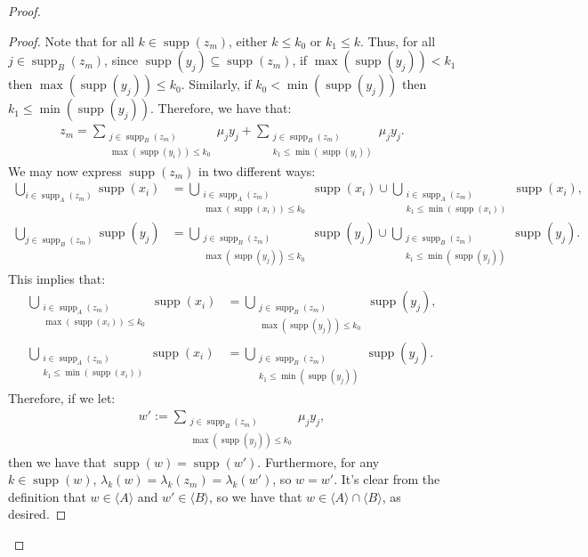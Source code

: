 \documentclass[10pt,a4paper]{amsart}
\theoremstyle{plain}
\numberwithin{equation}{section}
\theoremstyle{definition}
\newcommand{\func}{\operatorname}
\renewcommand{\c}[1]{\langle #1 \rangle}
\newcommand{\supp}{\func{supp}}
\newenvironment{midproof}[1][Proof]
  {\begin{proof}[#1]\renewcommand{\qedsymbol}{$\blacksquare$}}
  {\end{proof}}
\begin{document}
\begin{proof}
\begin{midproof}
        Note that for all $k \in \supp(z_m)$, either $k \leq k_0$ or $k_1 \leq k$. Thus, for all $j \in \supp_B(z_m)$, since $\supp(y_j) \subseteq \supp(z_m)$, if $\max(\supp(y_j)) < k_1$ then $\max(\supp(y_j)) \leq k_0$. Similarly, if $k_0 < \min(\supp(y_j))$ then $k_1 \leq \min(\supp(y_j))$. Therefore, we have that:
        \begin{align*}
            z_m = \sum_{\substack{j \in \supp_B(z_m) \\ \max(\supp(y_i)) \leq k_0}} \mu_j y_j + \sum_{\substack{j \in \supp_B(z_m) \\ k_1 \leq \min(\supp(y_i))}} \mu_j y_j.
        \end{align*}
        We may now express $\supp(z_m)$ in two different ways:
        \begin{align*}
            \bigcup_{i \in \supp_A(z_m)} \supp(x_i) &= \bigcup_{\substack{i \in \supp_A(z_m) \\ \max(\supp(x_i)) \leq k_0}} \supp(x_i) \cup \bigcup_{\substack{i \in \supp_A(z_m) \\ k_1 \leq \min(\supp(x_i))}} \supp(x_i), \\
            \bigcup_{j \in \supp_B(z_m)} \supp(y_j) &= \bigcup_{\substack{j \in \supp_B(z_m) \\ \max(\supp(y_j)) \leq k_0}} \supp(y_j) \cup \bigcup_{\substack{j \in \supp_B(z_m) \\ k_1 \leq \min(\supp(y_j))}} \supp(y_j).
        \end{align*}
        This implies that:
        \begin{align*}
            \bigcup_{\substack{i \in \supp_A(z_m) \\ \max(\supp(x_i)) \leq k_0}} \supp(x_i) &= \bigcup_{\substack{j \in \supp_B(z_m) \\ \max(\supp(y_j)) \leq k_0}} \supp(y_j), \\
            \bigcup_{\substack{i \in \supp_A(z_m) \\ k_1 \leq \min(\supp(x_i))}} \supp(x_i) &= \bigcup_{\substack{j \in \supp_B(z_m) \\ k_1 \leq \min(\supp(y_j))}} \supp(y_j).
        \end{align*}
        Therefore, if we let:
        \begin{align*}
            w' := \sum_{\substack{j \in \supp_B(z_m) \\ \max(\supp(y_j)) \leq k_0}} \mu_jy_j,
        \end{align*}
        then we have that $\supp(w) = \supp(w')$. Furthermore, for any $k \in \supp(w)$, $\lambda_k(w) = \lambda_k(z_m) = \lambda_k(w')$, so $w = w'$. It's clear from the definition that $w \in \c{A}$ and $w' \in \c{B}$, so we have that $w \in \c{A} \cap \c{B}$, as desired.
    \end{midproof}


\end{proof}
\end{document}
